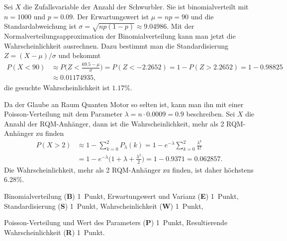\begin{loesung}
\begin{teilaufgaben}
\item
Sei $X$ die Zufallsvariable der Anzahl der Schwurbler.
Sie ist binomialverteilt mit $n=1000$ und $p=0.09$.
Der Erwartungswert ist $\mu=np=90$ und die Standardabweichung
ist $\sigma=\sqrt{np(1-p)}\approx 9.04986$.
Mit der Normalverteilungsapproximation der Binomialverteilung
kann man jetzt die Wahrscheinlichkeit ausrechnen.
Dazu bestimmt man die Standardisierung $Z=(X-\mu)/\sigma$ und
bekommt
\begin{align*}
P(X< 90)
&\approx
P\biggl(Z < \frac{69.5 -\mu}{\sigma}\biggr)
=
P(Z < -2.2652)
=
1-P(Z>2.2652)
=
1-0.98825
\\
&\approx
0.01174935,
\end{align*}
die gesuchte Wahrscheinlichkeit ist $1.17\%$.
\item
Da der Glaube an Raum Quanten Motor so selten ist, kann man ihn
mit einer
Poisson-Verteilung mit dem Parameter $\lambda = n\cdot 0.0009=0.9$
beschreiben.
Sei $X$ die Anzahl der RQM-Anhänger, dann ist die Wahrscheinlichkeit,
mehr als 2 RQM-Anhänger zu finden
\begin{align*}
P(X>2)
&\approx
1-\sum_{k=0}^2 P_\lambda(k)
=
1-e^{-\lambda} \sum_{k=0}^2 \frac{\lambda^k}{k!}
\\
&=
1-e^{-\lambda}\biggl(1+\lambda+\frac{\lambda^2}{2}\biggr)
=
1- 0.9371
=
0.062857.
\end{align*}
Die Wahrscheinlichkeit, mehr als 2 RQM-Anhänger zu finden, ist daher 
höchstens 6.28\%.
\qedhere
\end{teilaufgaben}
\end{loesung}

\begin{bewertung}
\begin{teilaufgaben}
\item
Binomialverteilung ({\bf B}) 1~Punkt,
Erwartungswert und Varianz ({\bf E}) 1~Punkt,
Standardisierung ({\bf S}) 1~Punkt,
Wahrscheinlichkeit ({\bf W}) 1~Punkt,
\item
Poisson-Verteilung und Wert des Parameters ({\bf P}) 1~Punkt,
Resultierende Wahrscheinlichkeit ({\bf R}) 1~Punkt.
\end{teilaufgaben}
\end{bewertung}



